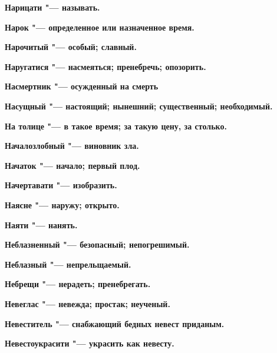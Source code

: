 \bfseries Нарицати \normalfont{} "--- называть. 




\bfseries Нарок \normalfont{} "--- определенное или назначенное время. 




\bfseries Нарочитый \normalfont{} "--- особый; славный. 




\bfseries Наругатися \normalfont{} "--- насмеяться; пренебречь; опозорить. 




\bfseries Насмертник \normalfont{} "--- осужденный на смерть 




\bfseries Насущный \normalfont{} "--- настоящий; нынешний; существенный; необходимый. 




\bfseries На толице \normalfont{} "--- в такое время; за такую цену, за столько. 




\bfseries Началозлобный \normalfont{} "--- виновник зла. 




\bfseries Начаток \normalfont{} "--- начало; первый плод. 




\bfseries Начертавати \normalfont{} "--- изобразить. 




\bfseries Наясне \normalfont{} "--- наружу; открыто. 




\bfseries Наяти \normalfont{} "--- нанять. 




\bfseries Неблазненный \normalfont{} "--- безопасный; непогрешимый. 




\bfseries Неблазный \normalfont{} "--- непрельщаемый. 




\bfseries Небрещи \normalfont{} "--- нерадеть; пренебрегать. 




\bfseries Невеглас \normalfont{} "--- невежда; простак; неученый. 




\bfseries Невеститель \normalfont{} "--- снабжающий бедных невест приданым. 




\bfseries Невестоукрасити \normalfont{} "--- украсить как невесту. 




